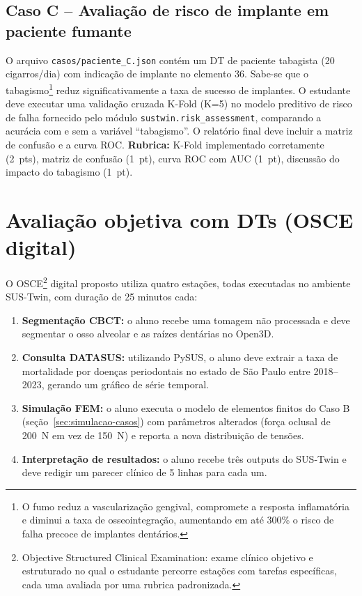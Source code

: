\subsection*{Caso C -- Avaliação de risco de implante em paciente fumante}

O arquivo \texttt{casos/paciente\_C.json} contém um DT de paciente tabagista
(20 cigarros/dia) com indicação de implante no elemento 36. Sabe-se que o
tabagismo\footnote{O fumo reduz a vascularização gengival, compromete a
resposta inflamatória e diminui a taxa de osseointegração, aumentando em
até 300\% o risco de falha precoce de implantes dentários.} reduz
significativamente a taxa de sucesso de implantes. O estudante deve executar
uma validação cruzada K-Fold (K=5) no modelo preditivo de risco de falha
fornecido pelo módulo \texttt{sustwin.risk\_assessment}, comparando a
acurácia com e sem a variável ``tabagismo''. O relatório final deve incluir
a matriz de confusão e a curva ROC.
\textbf{Rubrica:} K-Fold implementado corretamente (2~pts), matriz de
confusão (1~pt), curva ROC com AUC (1~pt), discussão do impacto do
tabagismo (1~pt).

\section{Avaliação objetiva com DTs (OSCE digital)}
\label{sec:osce-digital}

O OSCE\footnote{Objective Structured Clinical Examination: exame clínico
objetivo e estruturado no qual o estudante percorre estações com tarefas
específicas, cada uma avaliada por uma rubrica padronizada.} digital proposto
utiliza quatro estações, todas executadas no ambiente SUS-Twin, com duração
de 25 minutos cada:

\begin{enumerate}
\item \textbf{Segmentação CBCT:} o aluno recebe uma tomagem não processada e
deve segmentar o osso alveolar e as raízes dentárias no Open3D.
\item \textbf{Consulta DATASUS:} utilizando PySUS, o aluno deve extrair a
taxa de mortalidade por doenças periodontais no estado de São Paulo entre
2018--2023, gerando um gráfico de série temporal.
\item \textbf{Simulação FEM:} o aluno executa o modelo de elementos finitos
do Caso B (seção~\ref{sec:simulacao-casos}) com parâmetros alterados
(força oclusal de 200~N em vez de 150~N) e reporta a nova distribuição de
tensões.
\item \textbf{Interpretação de resultados:} o aluno recebe três outputs do
SUS-Twin e deve redigir um parecer clínico de 5 linhas para cada um.
\end{enumerate}

